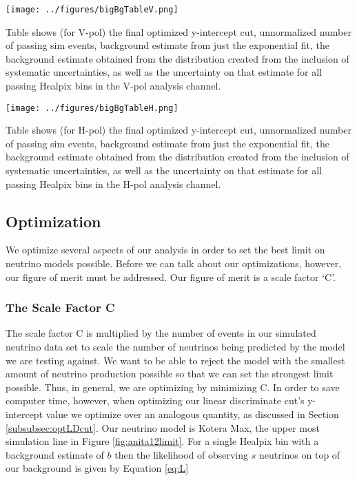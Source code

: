 \begin{table}[h]
\centering
\texttt{[image: ../figures/bigBgTableV.png]}
\caption[V-pol Passing Healpix bins Table]{Table shows (for V-pol) the final optimized y-intercept cut, unnormalized number of passing sim events, background estimate from just the exponential fit, the background estimate obtained from the distribution created from the inclusion of systematic uncertainties, as well as the uncertainty on that estimate for all passing Healpix bins in the V-pol analysis channel.}
\label{tab:bgTableV}
\end{table}

\begin{table}[h]
\centering
\texttt{[image: ../figures/bigBgTableH.png]}
\caption[H-pol Passing Healpix bins Table]{Table shows (for H-pol) the final optimized y-intercept cut, unnormalized number of passing sim events, background estimate from just the exponential fit, the background estimate obtained from the distribution created from the inclusion of systematic uncertainties, as well as the uncertainty on that estimate for all passing Healpix bins in the H-pol analysis channel.}
\label{tab:bgTableH}
\end{table}


\subsection{Optimization}

We optimize several aspects of our analysis in order to set the best limit on neutrino models possible.   Before we can talk about our optimizations, however, our figure of merit must be addressed.  Our figure of merit is a scale factor `C'.  

\subsubsection{The Scale Factor C}

The scale factor C is multiplied by the number of events in our simulated neutrino data set to scale the number of neutrinos being predicted by the model we are testing against.  We want to be able to reject the model with the smallest amount of neutrino production possible so that we can set the strongest limit possible.  Thus, in general, we are optimizing by minimizing C.  In order to save computer time, however, when optimizing our linear discriminate cut's y-intercept value we optimize over an analogous quantity, as discussed in Section \ref{subsubsec:optLDcut}.  Our neutrino model is Kotera Max, the upper most simulation line in Figure \ref{fig:anita12limit}.
For a single Healpix bin with a background estimate of $b$ then the likelihood of observing $s$ neutrinos on top of our background is given by Equation \ref{eq:L}

